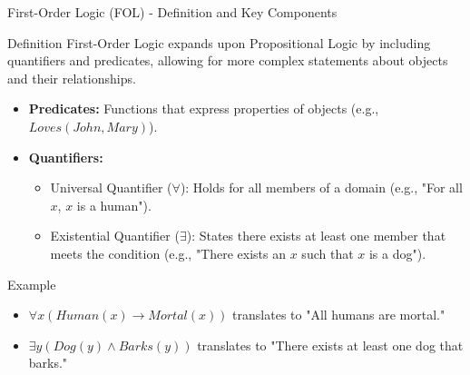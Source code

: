 \documentclass[aspectratio=169]{beamer}
\begin{document}
\begin{frame}[fragile]{First-Order Logic (FOL) - Definition and Key Components}
\begin{block}{Definition}
First-Order Logic expands upon Propositional Logic by including quantifiers and predicates, allowing for more complex statements about objects and their relationships.
\end{block}

\begin{itemize}
    \item \textbf{Predicates:} Functions that express properties of objects (e.g., $Loves(John, Mary)$).
    \item \textbf{Quantifiers:}
    \begin{itemize}
        \item Universal Quantifier ($\forall$): Holds for all members of a domain (e.g., "For all $x$, $x$ is a human").
        \item Existential Quantifier ($\exists$): States there exists at least one member that meets the condition (e.g., "There exists an $x$ such that $x$ is a dog").
    \end{itemize}
\end{itemize}

\begin{block}{Example}
\begin{itemize}
    \item $\forall x (Human(x) \rightarrow Mortal(x))$ translates to "All humans are mortal."
    \item $\exists y (Dog(y) \land Barks(y))$ translates to "There exists at least one dog that barks."
\end{itemize}
\end{block}
\end{frame}
\end{document}
